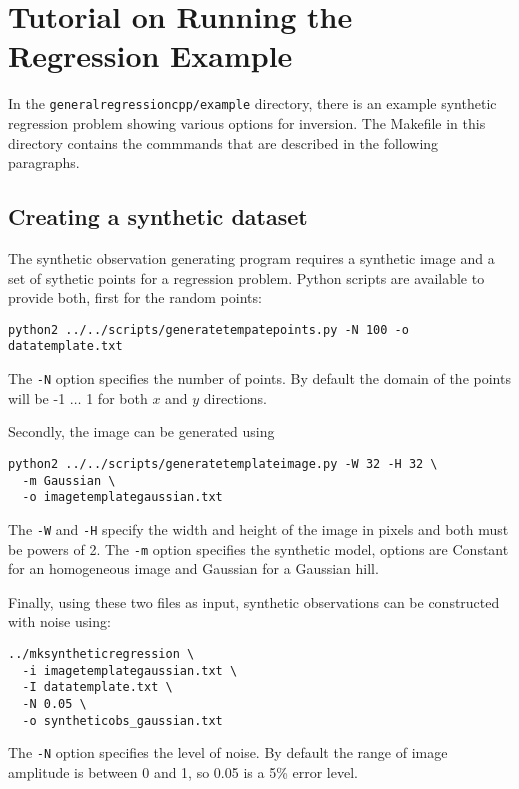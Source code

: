 \documentclass{article}
\begin{document}
\section{Tutorial on Running the Regression Example}

In the {\tt generalregressioncpp/example} directory, there is an example
synthetic regression problem showing various options for inversion.
The Makefile in this directory contains the commmands that are described
in the following paragraphs.

\subsection{Creating a synthetic dataset}

The synthetic observation generating program requires a synthetic
image and a set of sythetic points for a regression problem. Python scripts
are available to provide both, first for the random points:

\begin{verbatim}
python2 ../../scripts/generatetempatepoints.py -N 100 -o datatemplate.txt
\end{verbatim}

The {\tt -N} option specifies the number of points. By default the domain
of the points will be -1 $\ldots$ 1 for both $x$ and $y$ directions.

Secondly, the image can be generated using

\begin{verbatim}
python2 ../../scripts/generatetemplateimage.py -W 32 -H 32 \
  -m Gaussian \
  -o imagetemplategaussian.txt
\end{verbatim}

The {\tt -W} and {\tt -H} specify the width and height of the image in pixels
and both must be powers of 2. The {\tt -m} option specifies the synthetic
model, options are Constant for an homogeneous image and Gaussian for a Gaussian
hill.

Finally, using these two files as input, synthetic observations can be constructed
with noise using:

\begin{verbatim}
../mksyntheticregression \
  -i imagetemplategaussian.txt \
  -I datatemplate.txt \
  -N 0.05 \
  -o syntheticobs_gaussian.txt
\end{verbatim}

The {\tt -N} option specifies the level of noise. By default the range of image
amplitude is between 0 and 1, so 0.05 is a 5\% error level.
\end{document}
